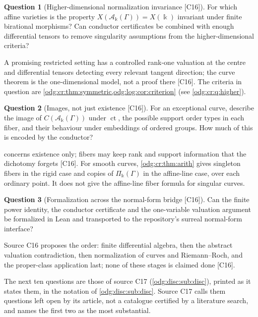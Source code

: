 \documentclass[11pt,oneside]{article}
\numberwithin{equation}{section}
\theoremstyle{definition}
\newtheorem{question}[question]{Question}
\theoremstyle{remark}
\newcommand{\ct}{\operatorname{ct}}
\newcommand{\src}[1]{\textup{\textsf{\small[#1]}}}
\newcommand{\crA}{\mathcal A_\Bbbk(\Gamma)}
\newcommand{\crP}{\Pi_\Bbbk(\Gamma)}
\begin{document}
\begin{question}[Higher-dimensional normalization invariance \src{C16}]\label{odg:sg:q:birational}
For which affine varieties is the property $X(\crA)=X(\Bbbk)$ invariant under finite
birational morphisms? Can conductor certificates be combined with enough differential
tensors to remove singularity assumptions from the higher-dimensional criteria?
\end{question}
A promising restricted setting has a controlled rank-one valuation at the centre and
differential tensors detecting every relevant tangent direction; the curve theorem is the
one-dimensional model, not a proof there \src{C16}. The criteria in question are
\cref{odg:cr:thm:symmetric,odg:log:cor:criterion} (see \cref{odg:cr:q:higher}).

\begin{question}[Images, not just existence \src{C16}]\label{odg:sg:q:images}
For an exceptional curve, describe the image of $C(\crA)$ under $\ct$, the possible support
order types in each fiber, and their behaviour under embeddings of ordered groups. How much
of this is encoded by the conductor?
\end{question}
 concerns existence only; fibers may keep rank and support
information that the dichotomy forgets \src{C16}. For smooth curves,
\cref{odg:cr:thm:arith} gives singleton fibers in the rigid case and
copies of $\crP$ in the affine-line case, over each ordinary point.
It does not give the affine-line fiber formula for singular curves.

\begin{question}[Formalization across the normal-form bridge \src{C16}]\label{odg:sg:q:lean}
Can the finite power identity, the conductor certificate and the one-variable valuation
argument be formalized in Lean and transported to the repository's surreal normal-form
interface?
\end{question}
Source C16 proposes the order: finite differential algebra, then the abstract valuation
contradiction, then normalization of curves and Riemann--Roch, and the proper-class
application last; none of these stages is claimed done \src{C16}.

The next ten questions are those of source C17 (\cref{odg:disc:sub:disc}), printed as it
states them, in the notation of \cref{odg:disc:sub:disc}. Source C17 calls them questions
left open by its article, not a catalogue certified by a literature search, and names the
first two as the most substantial.
\end{document}
